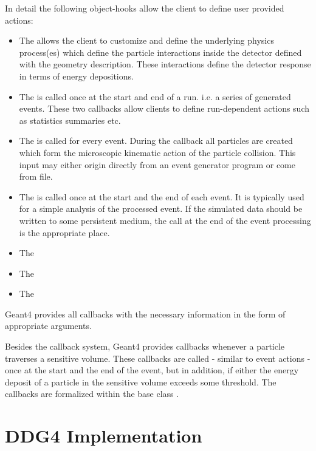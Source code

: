 \documentclass[10pt,a4paper]{article}
\begin{document}
\noindent
In detail the following object-hooks allow the client to define user provided actions:
\begin{itemize}\itemcompact
\item The  allows the client to customize and define 
    the underlying physics process(es) which define the particle interactions 
    inside the detector defined with the geometry description.
    These interactions define the detector response in terms of 
    energy depositions.
\item The  is called once at the start and end of a run. 
    i.e. a series of generated events. These two callbacks
    allow clients to define run-dependent actions such as statistics
    summaries etc.
\item The  is called for every event.
    During the callback all particles are created which form the 
    microscopic kinematic action of the particle collision.
    This input may either origin directly from an event generator program
    or come from file.
\item The  is called once at the start and the end of each event.
     It is typically used for a simple analysis of the processed event.
     If the simulated data should be written to some persistent medium, 
     the call at the end of the event processing is the appropriate place.
\item The  
\item The  
\item The  
\end{itemize}
\noindent
Geant4 provides all callbacks with the necessary information in the form of 
appropriate arguments.

\noindent
Besides the callback system, Geant4 provides callbacks whenever a particle
traverses a sensitive volume. These callbacks are called 
- similar to event actions - once at the start and the end of the event,
but in addition, if either the energy deposit of a particle in the 
sensitive volume exceeds some threshold. The callbacks are formalized within 
the base class .

\section{DDG4 Implementation}
\label{sec:ddg4-user-manual-implementation}
\end{document}
